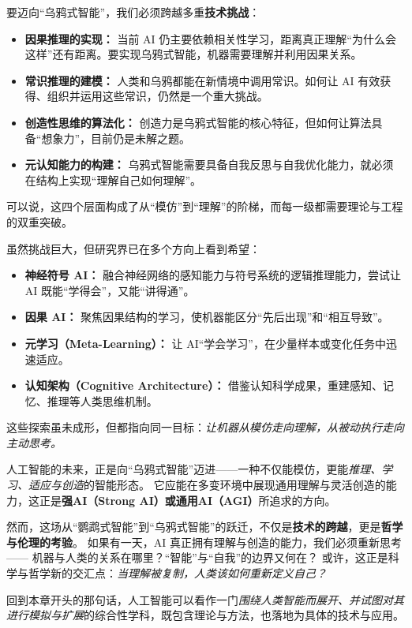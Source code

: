 要迈向“乌鸦式智能”，我们必须跨越多重\textbf{技术挑战}：  
\begin{itemize}
\item \textbf{因果推理的实现：} 当前 AI 仍主要依赖相关性学习，距离真正理解“为什么会这样”还有距离。要实现乌鸦式智能，机器需要理解并利用因果关系。  
\item \textbf{常识推理的建模：} 人类和乌鸦都能在新情境中调用常识。如何让 AI 有效获得、组织并运用这些常识，仍然是一个重大挑战。  

\item \textbf{创造性思维的算法化：} 创造力是乌鸦式智能的核心特征，但如何让算法具备“想象力”，目前仍是未解之题。  
\item \textbf{元认知能力的构建：} 乌鸦式智能需要具备自我反思与自我优化能力，就必须在结构上实现“理解自己如何理解”。  
\end{itemize}
可以说，这四个层面构成了从“模仿”到“理解”的阶梯，而每一级都需要理论与工程的双重突破。  

虽然挑战巨大，但研究界已在多个方向上看到希望：  
\begin{itemize}
\item \textbf{神经符号 AI：} 融合神经网络的感知能力与符号系统的逻辑推理能力，尝试让 AI 既能“学得会”，又能“讲得通”。  
\item \textbf{因果 AI：} 聚焦因果结构的学习，使机器能区分“先后出现”和“相互导致”。  
\item \textbf{元学习（Meta-Learning）：} 让 AI“学会学习”，在少量样本或变化任务中迅速适应。  
\item \textbf{认知架构（Cognitive Architecture）：} 借鉴认知科学成果，重建感知、记忆、推理等人类思维机制。  
\end{itemize}
这些探索虽未成形，但都指向同一目标：\emph{让机器从模仿走向理解，从被动执行走向主动思考。}  

人工智能的未来，正是向“乌鸦式智能”迈进——一种不仅能模仿，更能\emph{推理、学习、适应与创造}的智能形态。  
它应能在多变环境中展现通用理解与灵活创造的能力，这正是\textbf{强AI（Strong AI）或通用AI（AGI）}所追求的方向。  

然而，这场从“鹦鹉式智能”到“乌鸦式智能”的跃迁，不仅是\textbf{技术的跨越}，更是\textbf{哲学与伦理的考验}。  
如果有一天，AI 真正拥有理解与创造的能力，我们必须重新思考——  
机器与人类的关系在哪里？“智能”与“自我”的边界又何在？  
或许，这正是科学与哲学新的交汇点：\emph{当理解被复制，人类该如何重新定义自己？}  

回到本章开头的那句话，人工智能可以看作一门\emph{围绕人类智能而展开、并试图对其进行模拟与扩展}的综合性学科，既包含理论与方法，也落地为具体的技术与应用。

